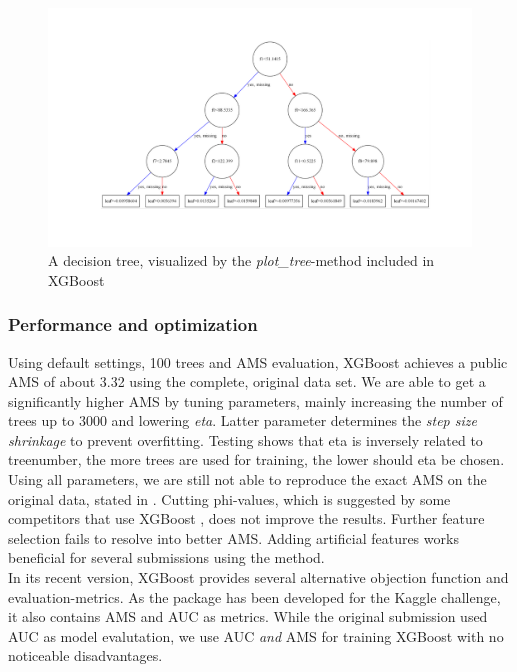 \begin{figure}[h]
\begin{center}
\includegraphics[width=\textwidth]{images/tree}
\caption{A decision tree, visualized by the \emph{plot\_tree}-method included in XGBoost}
\label{fig:tree}
\end{center}
\end{figure}

\subsubsection{Performance and optimization}
Using default settings, 100 trees and AMS evaluation, XGBoost achieves a public AMS of about 3.32 using the complete, original data set. We are able to get a significantly higher AMS by tuning parameters, mainly increasing the number of trees up to 3000 and lowering \emph{eta}. Latter parameter determines the \emph{step size shrinkage} to prevent overfitting. Testing shows that eta is inversely related to treenumber, the more trees are used for training, the lower should eta be chosen.
Using all parameters, we are still not able to reproduce the exact AMS on the original data, stated in \cite{chen14}.
Cutting phi-values, which is suggested by some competitors that use XGBoost \cite{blog}, does not improve the results. Further feature selection fails to resolve into better AMS. Adding artificial features works beneficial for several submissions using the method.\\
In its recent version, XGBoost provides several alternative objection function and evaluation-metrics. As the package has been developed for the Kaggle challenge, it also contains AMS and AUC as metrics. While the original submission used AUC as model evalutation, we use AUC \emph{and} AMS for training XGBoost with no noticeable disadvantages.


